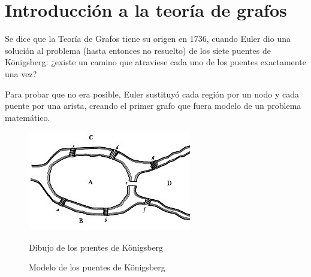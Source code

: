 \chapter{Introducción a la teoría de grafos}

\label{cap:Intro_Grafos}

Se dice que la Teoría de Grafos tiene su origen en 1736, cuando Euler dio una 
solución al problema (hasta entonces no resuelto) de los siete puentes de 
Königsberg: ¿existe un camino que atraviese cada uno de los puentes exactamente 
una vez?

Para probar que no era posible, Euler sustituyó cada región por un nodo y cada 
puente por una arista, creando el primer grafo que fuera modelo de un problema
matemático. 

\begin{figure}[h]
 \begin{minipage}[b]{.5\textwidth}
  \centering
  \includegraphics[scale=.75]{fig/images}
  \captionsetup{font=footnotesize}
  \caption{Dibujo de los puentes de Königsberg}
 \end{minipage}
 \begin{minipage}[b]{.5\textwidth}
  \centering
  \captionsetup{font=footnotesize}
  \caption{Modelo de los puentes de Königsberg}
 \end{minipage}
\end{figure}

